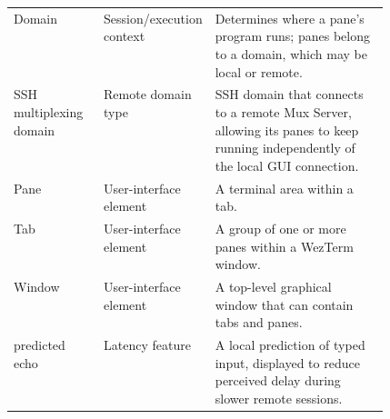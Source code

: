 \begin{table}[H]
\begin{tabularx}{\linewidth}{@{}>{\raggedright\arraybackslash}p{0.24\linewidth}>{\raggedright\arraybackslash}p{0.24\linewidth}X@{}}
    Domain & Session/execution context & Determines where a pane's program runs; panes belong to a domain, which may be local or remote. \\
    SSH multiplexing domain & Remote domain type & SSH domain that connects to a remote Mux Server, allowing its panes to keep running independently of the local GUI connection. \\
    Pane & User-interface element & A terminal area within a tab. \\
    Tab & User-interface element & A group of one or more panes within a WezTerm window. \\
    Window & User-interface element & A top-level graphical window that can contain tabs and panes. \\
    predicted echo & Latency feature & A local prediction of typed input, displayed to reduce perceived delay during slower remote sessions. \\
    \bottomrule
  \end{tabularx}
\end{table}